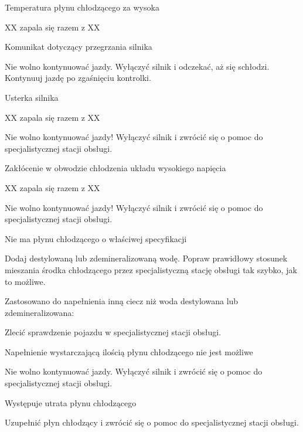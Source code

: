 Temperatura płynu chłodzącego za wysoka

XX zapala się razem z XX

Komunikat dotyczący przegrzania silnika
\begin{itemizeArrow}
	\itemArrow Nie wolno kontynuować jazdy.
	\itemArrow Wyłączyć silnik i odczekać, aż się schłodzi.
	\itemArrow Kontynuuj jazdę po zgaśnięciu kontrolki.
\end{itemizeArrow}

Usterka silnika

XX zapala się razem z XX

\begin{itemizeArrow}
	\itemArrow Nie wolno kontynuować jazdy!
	\itemArrow Wyłączyć silnik i zwrócić się o pomoc do specjalistycznej stacji obsługi.
\end{itemizeArrow}

Zakłócenie w obwodzie chłodzenia układu wysokiego napięcia

XX zapala się razem z XX
\begin{itemizeArrow}
	\itemArrow Nie wolno kontynuować jazdy!
	\itemArrow Wyłączyć silnik i zwrócić się o pomoc do specjalistycznej stacji obsługi.
\end{itemizeArrow}

Nie ma płynu chłodzącego o właściwej specyfikacji
\begin{itemizeArrow}
	\itemArrow Dodaj destylowaną lub zdemineralizowaną wodę.
	\itemArrow Popraw prawidłowy stosunek mieszania środka chłodzącego przez specjalistyczną stację obsługi tak szybko, jak to możliwe.
\end{itemizeArrow}

Zastosowano do napełnienia inną ciecz niż woda destylowana lub zdemineralizowana:
\begin{itemizeArrow}
	\itemArrow Zlecić sprawdzenie pojazdu w specjalistycznej stacji obsługi.
\end{itemizeArrow}

Napełnienie wystarczającą ilością płynu chłodzącego nie jest możliwe

\begin{itemizeArrow}
	\itemArrow Nie wolno kontynuować jazdy.
	\itemArrow Wyłączyć silnik i zwrócić się o pomoc do specjalistycznej stacji obsługi.
\end{itemizeArrow}

Występuje utrata płynu chłodzącego
\begin{itemizeArrow}
	\itemArrow Uzupełnić płyn chłodzący i zwrócić się o pomoc do specjalistycznej stacji obsługi.
\end{itemizeArrow}

